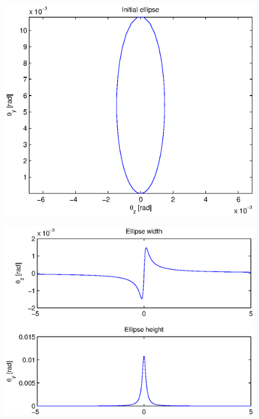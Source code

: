 \begin{figure}[tbh]
\includegraphics{figures/beam_deflection_script_01_initial_elipse}
\centering
\caption{}
\label{fig:beam_deflection_script_01_initial_elipse}
\end{figure}

\begin{figure}[tbh]
\includegraphics{figures/beam_deflection_script_02_elipse_width}
\centering
\caption{}
\label{fig:beam_deflection_script_02_elipse_width}
\end{figure}

